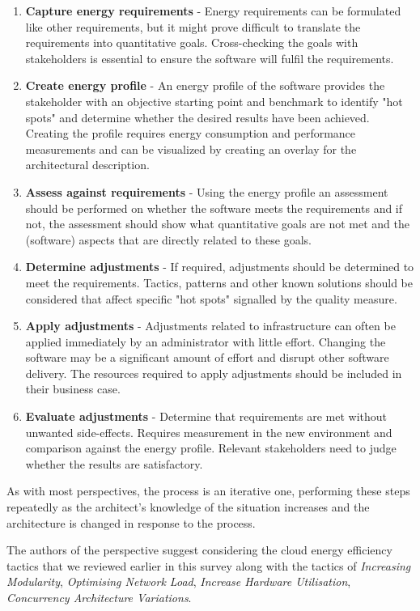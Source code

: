 \begin{enumerate}
	\item \textbf{Capture energy requirements} - Energy requirements can be formulated like other requirements, but it might prove difficult to translate the requirements into quantitative goals. Cross-checking the goals with stakeholders is essential to ensure the software will fulfil the requirements.
	\item \textbf{Create energy profile} - An energy profile of the software provides the stakeholder with an objective starting point and benchmark to identify "hot spots" and determine whether the desired results have been achieved. Creating the profile requires energy consumption and performance measurements and can be visualized by creating an overlay for the architectural description.
	\item \textbf{Assess against requirements} - Using the energy profile an assessment should be performed on whether the software meets the requirements and if not, the assessment should show what quantitative goals are not met and the (software) aspects that are directly related to these goals.
	\item \textbf{Determine adjustments} - If required, adjustments should be determined to meet the requirements. Tactics, patterns and other known solutions should be considered that affect specific "hot spots" signalled by the quality measure.
	\item \textbf{Apply adjustments} - Adjustments related to infrastructure can often be applied immediately by an administrator with little effort. Changing the software may be a significant amount of effort and disrupt other software delivery. The resources required to apply adjustments should be included in their business case.
	\item \textbf{Evaluate adjustments} - Determine that requirements are met without unwanted side-effects. Requires measurement in the new environment and comparison against the energy profile. Relevant stakeholders need to judge whether the results are satisfactory.
\end{enumerate}

As with most perspectives, the process is an iterative one, performing these steps repeatedly as the architect's knowledge of the situation increases and the architecture is changed in response to the process.

The authors of the perspective suggest considering the cloud energy efficiency tactics that we reviewed earlier in this survey along with the tactics of \emph{Increasing Modularity}, \emph{Optimising Network Load}, \emph{Increase Hardware Utilisation}, \emph{Concurrency Architecture Variations}.

